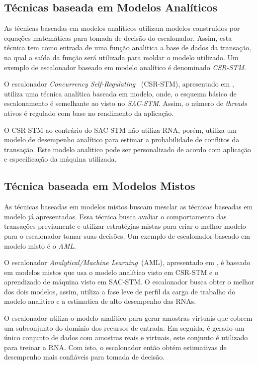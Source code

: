 \documentclass[ti]{texufpel}
\begin{document}
\subsection{Técnicas baseada em Modelos Analíticos}

As técnicas baseadas em modelos analíticos utilizam modelos construídos por equações matemáticas para tomada de decisão do escalonador. Assim, esta técnica tem como entrada de uma função analitica a base de dados da transação, na qual a saída da função será utilizada para moldar o modelo utilizado. Um exemplo de escalonador baseado em modelo  analítico é denominado \emph{CSR-STM}.

O escalonador \emph{Concurrency Self-Regulating }~(CSR-STM), apresentado em \cite{sanzo13}, utiliza uma técnica analítica baseada em modelo, onde, o esquema básico de escalonamento é semelhante ao visto no \emph{SAC-STM}. Assim, o número de \emph{threads} ativos é regulado com base no rendimento da aplicação.

O CSR-STM ao contrário do SAC-STM não utiliza RNA, porém, utiliza um modelo de desempenho analítico para estimar a probabilidade de conflitos da transação. Este modelo analitico pode ser personalizado de acordo com aplicação e especificação da máquina utilizada.

\subsection{Técnica baseada em Modelos Mistos}

As técnicas baseadas em modelos mistos buscam mesclar as técnicas baseadas em modelo já apresentadas. Essa técnica busca avaliar o comportamento das transações previamente e utilizar estratégias mistas para criar o melhor modelo para o escalonador tomar suas decisões. Um exemplo de escalonador baseado em modelo  misto é o \emph{AML}.

O escalonador \emph{Analytical/Machine Learning}~(AML), apresentado em \cite{rughetti14}, é baseado em modelos mistos que usa o modelo analítico visto em CSR-STM e o aprendizado de máquina visto em SAC-STM. O escalonador busca obter o melhor dos dois modelos, assim, utiliza a fase leve de perfil da carga de trabalho do modelo analitico e a estimatica de alto desempenho das RNAs.

O escalonador utiliza o modelo analítico para gerar amostras virtuais que cobrem um subconjunto do domínio dos recursos de entrada. Em seguida, é gerado um único conjunto de dados com amostras reais e virtuais, este conjunto é utilizado para treinar a RNA. Com isto, o escalonador então obtém estimativas de desempenho mais confiáveis para tomada de decisão.
\end{document}
